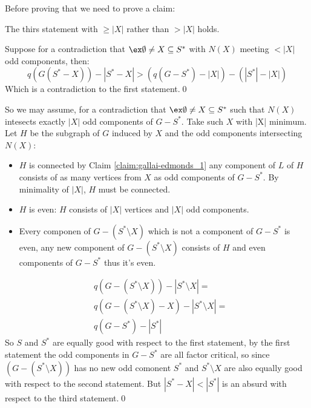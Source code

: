 \begin{prf}
    Before proving that we need to prove a claim:
    \begin{customclaim}{1}
    \label{claim:gallai-edmonds_1}
        The thirs statement with $\geq |X|$ rather than $> |X|$ holds.
    \end{customclaim}
    \begin{prf}
        Suppose for a contradiction that $\ex \emptyset \neq X \subseteq S^*$ with $N(X)$ meeting $< |X|$ odd components, then:
        \begin{equation*}
            \mathit{q}(G(S^* - X)) - |S^* - X| > (\mathit{q}(G - S^*) - |X|) - (|S^*| - |X|)
        \end{equation*}
        Which is a contradiction to the first statement.\qed
    \end{prf}
    So we may assume, for a contradiction that $\ex \emptyset \neq X \subseteq S^*$ such that $N(X)$ intesects exactly $|X|$ odd components of $G - S^*$. Take such $X$ with |X| minimum. Let $H$ be the subgraph of $G$ induced by $X$ and the odd components intersecting $N(X)$:
    \begin{itemize}
        \item $H$ is connected by Claim \ref{claim:gallai-edmonds_1} any component of $L$ of $H$ consists of as many vertices from $X$ as odd components of $G - S^*$. By minimality of $|X|$, $H$ must be connected.
        \item $H$ is even: $H$ consists of $|X|$ vertices and $|X|$ odd components.
        \item Every componen of $G - (S^* \setminus X)$ which is not a component of $G - S^*$ is even, any new component of $G - (S^* \setminus X)$ consists of $H$ and even components of $G - S^*$ thus it's even.
    \end{itemize}
    \begin{align*}
        &\mathit{q}(G - (S^* \setminus X)) - |S^* \setminus X| =\\ 
        &\mathit{q}(G - (S^* \setminus X) - X) - |S^* \setminus X| =\\
        &\mathit{q}(G - S^*) - |S^*|
    \end{align*}
    So $S$ and $S^*$ are equally good with respect to the first statement, by the first statement the odd components in $G - S^*$ are all factor critical, so since $(G - (S^* \setminus X))$ has no new odd comonent $S^*$ and $S^* \setminus X$ are also equally good with respect to the second statement. But $|S^* - X| < |S^*|$ is an absurd with respect to the third statement.\qed
\end{prf}
